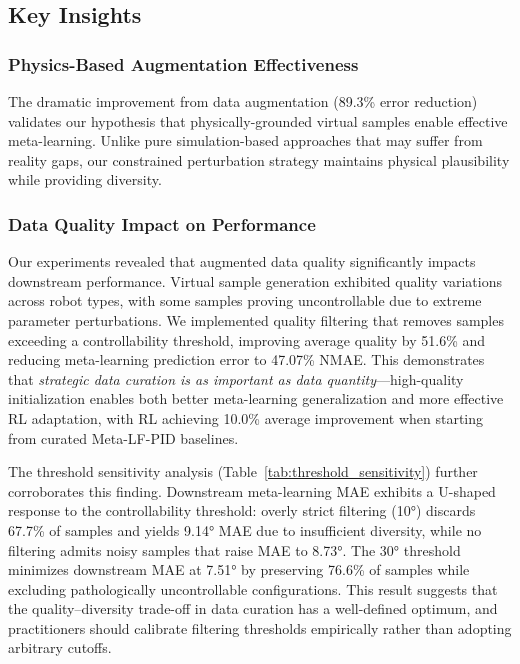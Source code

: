 \documentclass[DTMColor]{ROB-New}
\begin{document}
\subsection{Key Insights}

\subsubsection{Physics-Based Augmentation Effectiveness}

The dramatic improvement from data augmentation (89.3\% error reduction) validates our hypothesis that physically-grounded virtual samples enable effective meta-learning. Unlike pure simulation-based approaches that may suffer from reality gaps, our constrained perturbation strategy maintains physical plausibility while providing diversity.

\subsubsection{Data Quality Impact on Performance}

Our experiments revealed that augmented data quality significantly impacts downstream performance. Virtual sample generation exhibited quality variations across robot types, with some samples proving uncontrollable due to extreme parameter perturbations. We implemented quality filtering that removes samples exceeding a controllability threshold, improving average quality by 51.6\% and reducing meta-learning prediction error to 47.07\% NMAE. This demonstrates that \textit{strategic data curation is as important as data quantity}—high-quality initialization enables both better meta-learning generalization and more effective RL adaptation, with RL achieving 10.0\% average improvement when starting from curated Meta-LF-PID baselines.

{\color{blue}The threshold sensitivity analysis (Table~\ref{tab:threshold_sensitivity}) further corroborates this finding. Downstream meta-learning MAE exhibits a U-shaped response to the controllability threshold: overly strict filtering (10°) discards 67.7\% of samples and yields 9.14° MAE due to insufficient diversity, while no filtering admits noisy samples that raise MAE to 8.73°. The 30° threshold minimizes downstream MAE at 7.51° by preserving 76.6\% of samples while excluding pathologically uncontrollable configurations. This result suggests that the quality--diversity trade-off in data curation has a well-defined optimum, and practitioners should calibrate filtering thresholds empirically rather than adopting arbitrary cutoffs.}
\end{document}
